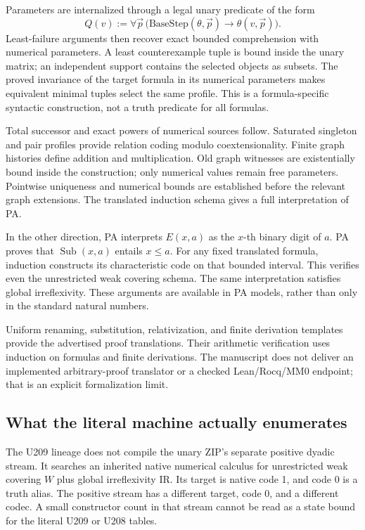 \documentclass[11pt,letterpaper]{article}
\newcommand{\Sub}{\operatorname{Sub}}
\newcommand{\IR}{\mathrm{IR}}
\begin{document}
Parameters are internalized through a legal unary predicate of the form
\[
Q(v):=\forall\vec p\,
\bigl(\mathrm{BaseStep}(\theta,\vec p)\to\theta(v,\vec p)\bigr).
\]
Least-failure arguments then recover exact bounded comprehension with
numerical parameters. A least counterexample tuple is bound inside the
unary matrix; an independent support contains the selected objects as
subsets. The proved invariance of the target formula in its numerical
parameters makes equivalent minimal tuples select the same profile.
This is a formula-specific syntactic construction, not a truth
predicate for all formulas.

Total successor and exact powers of numerical sources follow. Saturated singleton and pair
profiles provide relation coding modulo coextensionality. Finite graph
histories define addition and multiplication. Old graph witnesses are
existentially bound inside the construction; only numerical values remain
free parameters. Pointwise uniqueness and numerical bounds are established
before the relevant graph extensions. The translated induction schema
gives a full interpretation of PA.

In the other direction, PA interprets \(E(x,a)\) as the \(x\)-th binary
digit of \(a\). PA proves that \(\Sub(x,a)\) entails \(x\le a\).
For any fixed translated formula, induction constructs its characteristic
code on that bounded interval. This verifies even the unrestricted weak
covering schema. The same interpretation satisfies global irreflexivity.
These arguments are available in PA models, rather than only in the
standard natural numbers.

Uniform renaming, substitution, relativization, and finite derivation
templates provide the advertised proof translations. Their arithmetic
verification uses induction on formulas and finite derivations. The
manuscript does not deliver an implemented arbitrary-proof translator or
a checked Lean/Rocq/MM0 endpoint; that is an explicit formalization limit.

\subsection{What the literal machine actually enumerates}

The U209 lineage does not compile the unary ZIP's separate positive
dyadic stream. It searches an inherited native numerical calculus for
unrestricted weak covering \(W\) plus global irreflexivity \(\IR\).
Its target is native code 1, and code 0 is a truth alias. The positive
stream has a different target, code 0, and a different codec. A small
constructor count in that stream cannot be read as a state bound for
the literal U209 or U208 tables.
\end{document}

